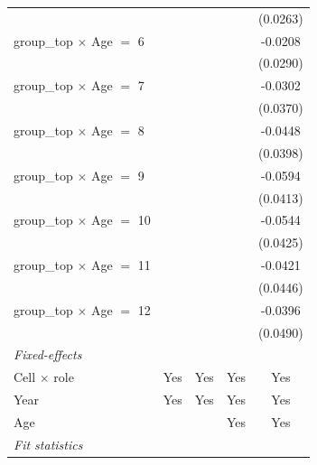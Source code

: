 \begin{table}[htbp]
\begin{tabular}{lcccc}
                                       &               &          &               & (0.0263)\\   
      group\_top $\times$ Age $=$ 6    &               &          &               & -0.0208\\   
                                       &               &          &               & (0.0290)\\   
      group\_top $\times$ Age $=$ 7    &               &          &               & -0.0302\\   
                                       &               &          &               & (0.0370)\\   
      group\_top $\times$ Age $=$ 8    &               &          &               & -0.0448\\   
                                       &               &          &               & (0.0398)\\   
      group\_top $\times$ Age $=$ 9    &               &          &               & -0.0594\\   
                                       &               &          &               & (0.0413)\\   
      group\_top $\times$ Age $=$ 10   &               &          &               & -0.0544\\   
                                       &               &          &               & (0.0425)\\   
      group\_top $\times$ Age $=$ 11   &               &          &               & -0.0421\\   
                                       &               &          &               & (0.0446)\\   
      group\_top $\times$ Age $=$ 12   &               &          &               & -0.0396\\   
                                       &               &          &               & (0.0490)\\   
      \midrule
      \emph{Fixed-effects}\\
      Cell $\times$ role               & Yes           & Yes      & Yes           & Yes\\  
      Year                             & Yes           & Yes      & Yes           & Yes\\  
      Age                              &               &          & Yes           & Yes\\  
      \midrule
      \emph{Fit statistics}\\

\end{tabular}
\end{table}
